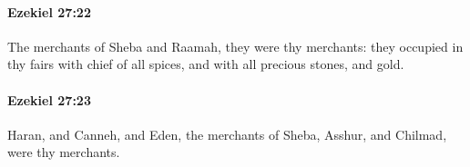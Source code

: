 		\paragraph{Ezekiel 27:22} %
			\label{EZEKIEL-27-22}

			The merchants of Sheba and Raamah, they were thy merchants: they occupied in thy fairs with chief of all spices, and with all precious stones, and gold.


		\paragraph{Ezekiel 27:23} %
			\label{EZEKIEL-27-23}

			Haran, and Canneh, and Eden, the merchants of Sheba, Asshur, and Chilmad, were thy merchants.


